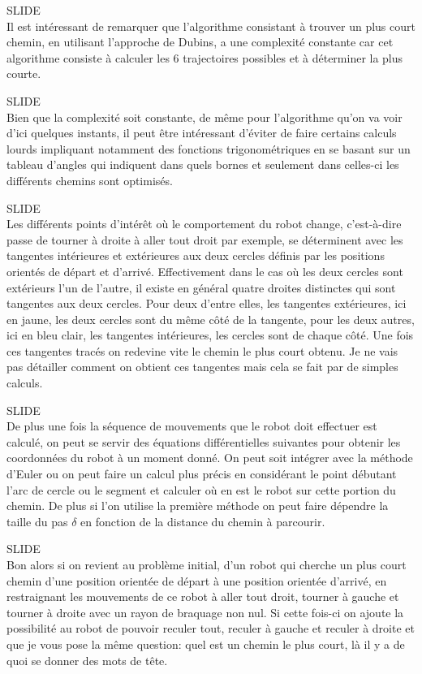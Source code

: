 \documentclass[12pt,a4paper]{article}
\newcommand{\slide}{\vspace{0.6cm}SLIDE\\}
\begin{document}
	\slide
	
	Il est intéressant de remarquer que l'algorithme consistant à trouver un plus court chemin, en utilisant l'approche de Dubins, a une complexité constante car cet algorithme consiste à calculer les 6 trajectoires possibles et à déterminer la plus courte.
	
	\slide
	
	Bien que la complexité soit constante, de même pour l'algorithme qu'on va voir d'ici quelques instants, il peut être intéressant d'éviter de faire certains calculs lourds impliquant notamment des fonctions trigonométriques en se basant sur un tableau d'angles qui indiquent dans quels bornes et seulement dans celles-ci les différents chemins sont optimisés.
	
	\slide
	
	Les différents points d'intérêt où le comportement du robot change, c'est-à-dire passe de tourner à droite à aller tout droit par exemple, se déterminent avec les tangentes intérieures et extérieures aux deux cercles définis par les positions orientés de départ et d'arrivé. Effectivement dans le cas où les deux cercles sont extérieurs l'un de l'autre, il existe en général quatre droites distinctes qui sont tangentes aux deux cercles. Pour deux d'entre elles, les tangentes extérieures, ici en jaune, les deux cercles sont du même côté de la tangente, pour les deux autres, ici en bleu clair, les tangentes intérieures, les cercles sont de chaque côté. Une fois ces tangentes tracés on redevine vite le chemin le plus court obtenu. Je ne vais pas détailler comment on obtient ces tangentes mais cela se fait par de simples calculs.%
	
	\slide
	
	De plus une fois la séquence de mouvements que le robot doit effectuer est calculé, on peut se servir des équations différentielles suivantes pour obtenir les coordonnées du robot à un moment donné. On peut soit intégrer avec la méthode d'Euler ou on peut faire un calcul plus précis en considérant le point débutant l'arc de cercle ou le segment et calculer où en est le robot sur cette portion du chemin. De plus si l'on utilise la première méthode on peut faire dépendre la taille du pas $\delta$ en fonction de la distance du chemin à parcourir.
	
	\slide
	
	Bon alors si on revient au problème initial, d'un robot qui cherche un plus court chemin d'une position orientée de départ à une position orientée d'arrivé, en restraignant les mouvements de ce robot à aller tout droit, tourner à gauche et tourner à droite avec un rayon de braquage non nul. Si cette fois-ci on ajoute la possibilité au robot de pouvoir reculer tout, reculer à gauche et reculer à droite et que je vous pose la même question: quel est un chemin le plus court, là il y a de quoi se donner des mots de tête.
	
\end{document}
